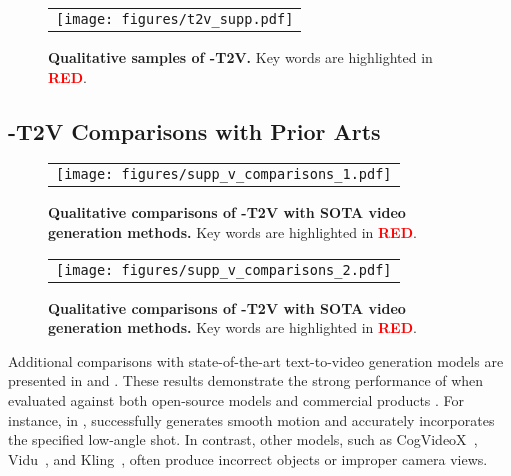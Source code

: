 \begin{figure}[ht]
\begin{center}
\begin{tabular}{c}
\texttt{[image: figures/t2v\_supp.pdf]} \\
\end{tabular}
\end{center}
\caption{\textbf{Qualitative samples of \ours-T2V.} Key words are highlighted in \textcolor{red}{\textbf{RED}}.}
\label{fig:t2v_supp}
\end{figure}



\subsection{\ours-T2V Comparisons with Prior Arts}

\begin{figure}[ht]
\begin{center}
\begin{tabular}{c}
\texttt{[image: figures/supp\_v\_comparisons\_1.pdf]} \\
\end{tabular}
\end{center}
\caption{\textbf{Qualitative comparisons of \ours-T2V with SOTA video generation methods.} Key words are highlighted in \textcolor{red}{\textbf{RED}}.}
\label{fig:video_comparisons_supp1}
\end{figure}


\begin{figure}[ht]
\begin{center}
\begin{tabular}{c}
\texttt{[image: figures/supp\_v\_comparisons\_2.pdf]} \\
\end{tabular}
\end{center}
\caption{\textbf{Qualitative comparisons of \ours-T2V with SOTA video generation methods.} Key words are highlighted in \textcolor{red}{\textbf{RED}}.}
\label{fig:video_comparisons_supp2}
\end{figure}

Additional comparisons with state-of-the-art text-to-video generation models are presented in  and . These results demonstrate the strong performance of \ours when evaluated against both open-source models \citep{yang2024cogvideox,opensora} and commercial products \citep{pika,kuaishou2024klingai,bao2024vidu,DreamMachine}. For instance, in , \ours successfully generates smooth motion and accurately incorporates the specified low-angle shot. In contrast, other models, such as CogVideoX~\citep{yang2024cogvideox}, Vidu~\citep{bao2024vidu}, and Kling~\citep{kuaishou2024klingai}, often produce incorrect objects or improper camera views.


